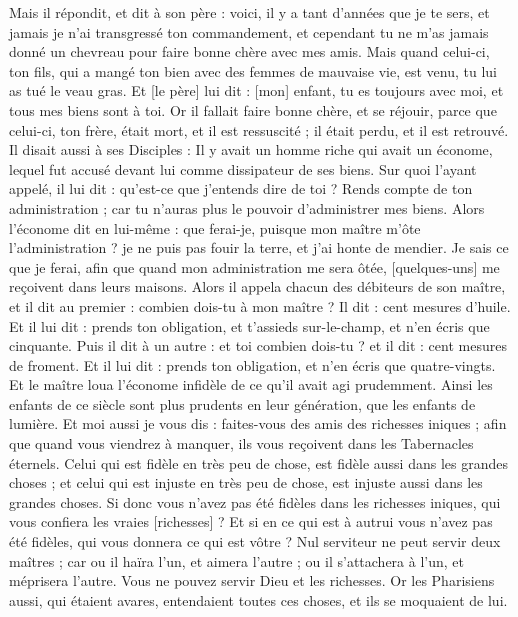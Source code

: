 \begin{multicols}{2}
Mais il répondit, et dit à son père : voici, il y a tant d'années que je te sers, et jamais je n'ai transgressé ton commandement, et cependant tu ne m'as jamais donné un chevreau pour faire bonne chère avec mes amis.
Mais quand celui-ci, ton fils, qui a mangé ton bien avec des femmes de mauvaise vie, est venu, tu lui as tué le veau gras.
Et [le père] lui dit : [mon] enfant, tu es toujours avec moi, et tous mes biens sont à toi.
Or il fallait faire bonne chère, et se réjouir, parce que celui-ci, ton frère, était mort, et il est ressuscité ; il était perdu, et il est retrouvé.
\VerseOne{}Il disait aussi à ses Disciples : Il y avait un homme riche qui avait un économe, lequel fut accusé devant lui comme dissipateur de ses biens.
Sur quoi l'ayant appelé, il lui dit : qu'est-ce que j'entends dire de toi ? Rends compte de ton administration ; car tu n'auras plus le pouvoir d'administrer mes biens.
Alors l'économe dit en lui-même : que ferai-je, puisque mon maître m'ôte l'administration ? je ne puis pas fouir la terre, et j'ai honte de mendier.
Je sais ce que je ferai, afin que quand mon administration me sera ôtée, [quelques-uns] me reçoivent dans leurs maisons.
Alors il appela chacun des débiteurs de son maître, et il dit au premier : combien dois-tu à mon maître ?
Il dit : cent mesures d'huile. Et il lui dit : prends ton obligation, et t'assieds sur-le-champ, et n'en écris que cinquante.
Puis il dit à un autre : et toi combien dois-tu ? et il dit : cent mesures de froment. Et il lui dit : prends ton obligation, et n'en écris que quatre-vingts.
Et le maître loua l'économe infidèle de ce qu'il avait agi prudemment. Ainsi les enfants de ce siècle sont plus prudents en leur génération, que les enfants de lumière.
Et moi aussi je vous dis : faites-vous des amis des richesses iniques ; afin que quand vous viendrez à manquer, ils vous reçoivent dans les Tabernacles éternels.
Celui qui est fidèle en très peu de chose, est fidèle aussi dans les grandes choses ; et celui qui est injuste en très peu de chose, est injuste aussi dans les grandes choses.
Si donc vous n'avez pas été fidèles dans les richesses iniques, qui vous confiera les vraies [richesses] ?
Et si en ce qui est à autrui vous n'avez pas été fidèles, qui vous donnera ce qui est vôtre ?
Nul serviteur ne peut servir deux maîtres ; car ou il haïra l'un, et aimera l'autre ; ou il s'attachera à l'un, et méprisera l'autre. Vous ne pouvez servir Dieu et les richesses.
Or les Pharisiens aussi, qui étaient avares, entendaient toutes ces choses, et ils se moquaient de lui.

\end{multicols}
